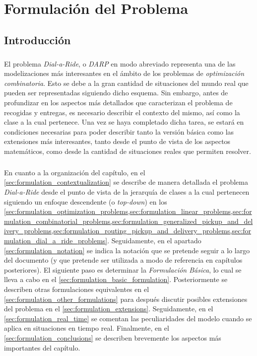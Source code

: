 \documentclass{subfiles}
\begin{document}
  \chapter{Formulación del Problema}
  \label{chap:formulation}

    \section{Introducción}
    \label{sec:formulation_introduction}

      \paragraph{}
      El problema \emph{Dial-a-Ride}, o \emph{DARP} en modo abreviado representa una de las modelizaciones más interesantes en el ámbito de los problemas de \emph{optimización combinatoria}. Esto se debe a la gran cantidad de situaciones del mundo real que pueden ser representadas siguiendo dicho esquema. Sin embargo, antes de profundizar en los aspectos más detallados que caracterizan el problema de recogidas y entregas, es necesario describir el contexto del mismo, así como la clase a la cual pertenece. Una vez se haya completado dicha tarea, se estará en condiciones necesarias para poder describir tanto la versión básica como las extensiones más interesantes, tanto desde el punto de vista de los aspectos matemáticos, como desde la cantidad de situaciones reales que permiten resolver.

      \paragraph{}
      En cuanto a la organización del capítulo, en el \cref{sec:formulation_contextualization} se describe de manera detallada el problema \emph{Dial-a-Ride} desde el punto de vista de la jerarquía de clases a la cual pertenecen siguiendo un enfoque descendente (o \emph{top-down}) en los \cref{sec:formulation_optimization_problems,sec:formulation_linear_problems,sec:formulation_combinatorial_problems,sec:formulation_generalized_pickup_and_delivery_problems,sec:formulation_routing_pickup_and_delivery_problems,sec:formulation_dial_a_ride_problems}. Seguidamente, en el apartado \cref{sec:formulation_notation} se indica la notación que se pretende seguir a lo largo del documento (y que pretende ser utilizada a modo de referencia en capítulos posteriores). El siguiente paso es determinar la \emph{Formulación Básica}, lo cual se lleva a cabo en el \cref{sec:formulation_basic_formulation}. Posteriormente se describen otras formulaciones equivalentes en el \cref{sec:formulation_other_formulations} para después discutir posibles extensiones del problema en el \cref{sec:formulation_extensions}. Seguidamente, en el \cref{sec:formulation_real_time} se comentan las peculiaridades del modelo cuando se aplica en situaciones en tiempo real. Finalmente, en el \cref{sec:formulation_conclusions} se describen brevemente los aspectos más importantes del capítulo.
\end{document}
